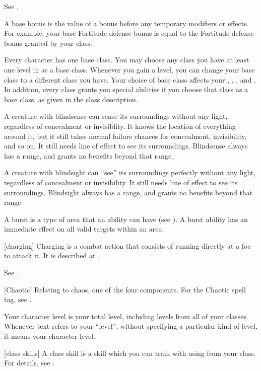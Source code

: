  See .

 A base bonus is the value of a bonus before any temporary modifiers or effects. For example, your base Fortitude defense bonus is equal to the Fortitude defense bonus granted by your class.

 Every character has one base class.
You may choose any class you have at least one level in as a base class.
Whenever you gain a level, you can change your base class to a different class you have.
Your choice of base class affects your , , , and .
In addition, every class grants you special abilities if you choose that class as a base class, as given in the class description.

 A creature with blindsense can sense its surroundings without any light, regardless of concealment or invisiblity.
It knows the location of everything around it, but it still takes normal failure chances for concealment, invisibility, and so on.
It still needs line of effect to see its surroundings.
Blindsense always has a range, and grants no benefits beyond that range.

 A creature with blindsight can ``see'' its surroundings perfectly without any light, regardless of concealment or invisibility.
It still needs line of effect to see its surroundings.
Blindsight always has a range, and grants no benefits beyond that range.

 A burst is a type of area that an ability can have (see ).
A burst ability has an immediate effect on all valid targets within an area.

[charging] Charging is a combat action that consists of running directly at a foe to attack it.
It is described at .

 See .

[Chaotic] Relating to chaos, one of the four  components. For the Chaotic spell tag, see .

 Your character level is your total level, including levels from all of your classes.
Whenever text refers to your ``level'', without specifying a particular kind of level, it means your character level.

[class skills] A class skill is a skill which you can train with using  from your class. For details, see .

